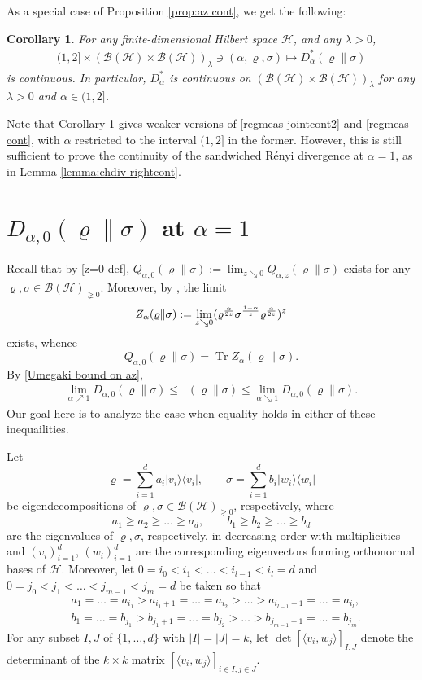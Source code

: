 \documentclass[unsortedaddress,superscriptaddress,pra,notitlepage]{revtex4}
\newtheorem{cor}[definition]{Corollary}
\def\B{{\mathcal B}}
\def\rho{\varrho}
\def\hil{{\mathcal H}}
\def\nw{^{*}}
\def\pne{_{\gneq 0}}
\def\cpso{\text{CPSO} }
\def\cH{\mathcal{H}}
\def\<{\langle}
\def\>{\rangle}
\def\<{\langle}
\def\>{\rangle}
\DeclareMathOperator{\Tr}{Tr}
\DeclareMathOperator{\DU}{\mathit{D}^{Um}}
\begin{document}
As a special case of Proposition \ref{prop:az cont}, we get the following:
\begin{cor}\label{cor:sandwiched jointcont}
For any finite-dimensional Hilbert space $\hil$, and any $\lambda>0$, 
\begin{align*}
(1,2]\times(\B(\hil)\times\B(\hil))_{\lambda}\ni(\alpha,\rho,\sigma)
\mapsto D_{\alpha}\nw(\rho\|\sigma)
\end{align*}
is continuous. In particular, $D_{\alpha}\nw$ is continuous on 
$(\B(\hil)\times\B(\hil))_{\lambda}$ for any $\lambda>0$ and $\alpha\in(1,2]$. 
\end{cor}

Note that Corollary \ref{cor:sandwiched jointcont} gives  weaker versions of 
\eqref{regmeas jointcont2} and \eqref{regmeas cont},
with $\alpha$ restricted to the interval $(1,2]$ in the former.
However, this is still sufficient to prove the continuity of the sandwiched 
\cpso R\'enyi  divergence at $\alpha=1$, 
as in Lemma \ref{lemma:chdiv rightcont}.

\section{$D_{\alpha,0}(\rho\|\sigma)$ at $\alpha=1$}
\label{sec:zero Renyi limit}

Recall that by \eqref{z=0 def}, 
$Q_{\alpha,0}(\rho\|\sigma):=\lim_{z\searrow0}Q_{\alpha,z}(\rho\|\sigma)$
exists for any $\rho,\sigma\in\B(\hil)\pne$. Moreover, 
by \cite[Theorem 2.5]{AH2019}, the limit
\[
Z_\alpha(\rho\|\sigma):=\lim_{z\searrow0}(\rho^{\alpha\over2z}\sigma^{1-\alpha\over z}
\rho^{\alpha\over2z})^z
\]
exists, whence
\[
Q_{\alpha,0}(\rho\|\sigma)
=\Tr Z_\alpha(\rho\|\sigma).
\]
By \eqref{Umegaki bound on az},
\begin{align}\label{Renyi alpha 0 limit1}
\lim_{\alpha\nearrow 1}D_{\alpha,0}(\rho\|\sigma)\le
\DU(\rho\|\sigma)\le 
\lim_{\alpha\searrow 1}D_{\alpha,0}(\rho\|\sigma).
\end{align} 
Our goal here is to analyze the case when equality holds in either of these inequailities.

Let 
\[
\rho=\sum_{i=1}^da_i|v_i\>\<v_i|,\qquad
\sigma=\sum_{i=1}^db_i|w_i\>\<w_i|
\]
be eigendecompositions of $\rho,\sigma\in\B(\hil)\pne$, respectively, where
\[
a_1\ge a_2\ge\ldots\ge a_d,\qquad b_1\ge b_2\ge\ldots\ge b_d
\]
are the eigenvalues of $\rho,\sigma$, respectively, in decreasing order with multiplicities
and  $(v_i)_{i=1}^d$, $(w_i)_{i=1}^d$ are the corresponding eigenvectors forming
orthonormal bases of $\cH$. Moreover, let $0=i_0<i_1<\ldots<i_{l-1}<i_l=d$ and
$0=j_0<j_1<\ldots<j_{m-1}<j_m=d$ be taken so that
\begin{align*}
&a_1=\ldots=a_{i_1}>a_{i_1+1}=\ldots=a_{i_2}>\ldots>a_{i_{l-1}+1}=\ldots=a_{i_l}, \\
&b_1=\ldots=b_{j_1}>b_{j_1+1}=\ldots=b_{j_2}>\ldots>b_{j_{m-1}+1}=\ldots=b_{j_m}.
\end{align*}
For any subset $I,J$ of $\{1,\ldots,d\}$ with $|I|=|J|=k$, let $\det[\<v_i,w_j\>]_{I,J}$ denote
the determinant of the $k\times k$ matrix $[\<v_i,w_j\>]_{i\in I,j\in J}$.
\end{document}
